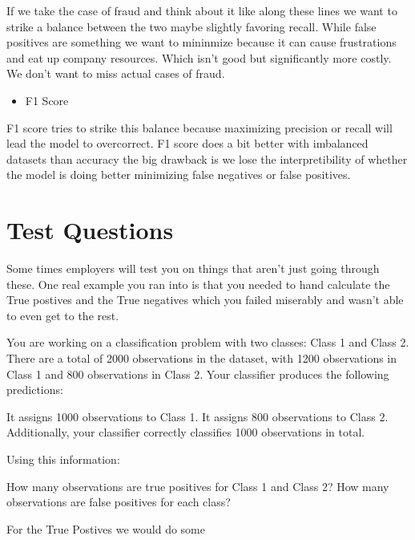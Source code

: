\documentclass[
  letterpaper,
  DIV=11,
  numbers=noendperiod]{scrreprt}
\providecommand{\tightlist}{%
  \setlength{\itemsep}{0pt}\setlength{\parskip}{0pt}}\usepackage{longtable,booktabs,array}
\begin{document}
If we take the case of fraud and think about it like along these lines
we want to strike a balance between the two maybe slightly favoring
recall. While false positives are something we want to mininmize because
it can cause frustrations and eat up company resources. Which isn't good
but significantly more costly. We don't want to miss actual cases of
fraud.

\begin{itemize}
\tightlist
\item
  F1 Score
\end{itemize}

F1 score tries to strike this balance because maximizing precision or
recall will lead the model to overcorrect. F1 score does a bit better
with imbalanced datasets than accuracy the big drawback is we lose the
interpretibility of whether the model is doing better minimizing false
negatives or false positives.

\section{Test Questions}\label{test-questions}

Some times employers will test you on things that aren't just going
through these. One real example you ran into is that you needed to hand
calculate the True postives and the True negatives which you failed
miserably and wasn't able to even get to the rest.

You are working on a classification problem with two classes: Class 1
and Class 2. There are a total of 2000 observations in the dataset, with
1200 observations in Class 1 and 800 observations in Class 2. Your
classifier produces the following predictions:

It assigns 1000 observations to Class 1. It assigns 800 observations to
Class 2. Additionally, your classifier correctly classifies 1000
observations in total.

Using this information:

How many observations are true positives for Class 1 and Class 2? How
many observations are false positives for each class?

For the True Postives we would do some
\end{document}
